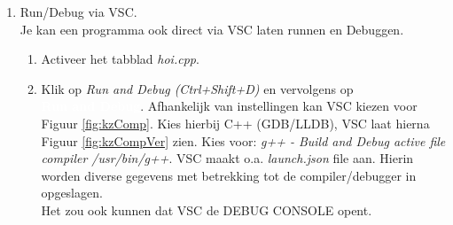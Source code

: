 \begin{enumerate}
     \item Run/Debug via VSC.\\
     Je kan een programma ook direct via VSC laten runnen en Debuggen.
     \begin{enumerate}
     	\item Activeer het tabblad \textit{hoi.cpp}.
     	\item Klik op \textit{Run and Debug (Ctrl+Shift+D)}  en vervolgens op\\ \colorbox{NavyBlue}{\textcolor{White}{\textbf{Run and Debug}}}. Afhankelijk van instellingen kan VSC kiezen voor Figuur \ref{fig:kzComp}. 
   Kies hierbij C++ (GDB/LLDB), VSC laat hierna Figuur \ref{fig:kzCompVer} zien. Kies voor: \textit{g++ - Build and Debug active file \small{compiler /usr/bin/g++}}.
   VSC maakt o.a. \textit{launch.json} file aan. Hierin worden diverse gegevens met betrekking tot de compiler/debugger in opgeslagen. \\
   Het zou ook kunnen dat VSC de DEBUG CONSOLE opent. 
      

\end{enumerate}
\end{enumerate}

